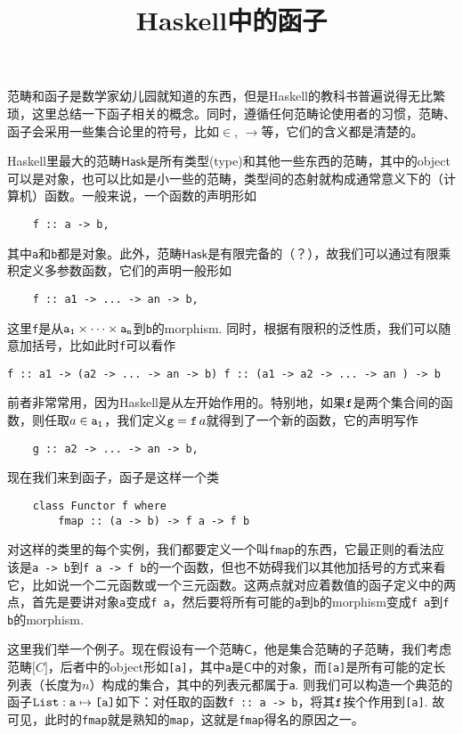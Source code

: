 \documentclass[10pt]{article}
\title{Haskell中的函子}
\author{}
\begin{document}
范畴和函子是数学家幼儿园就知道的东西，但是Haskell的教科书普遍说得无比繁琐，这里总结一下函子相关的概念。同时，遵循任何范畴论使用者的习惯，范畴、函子会采用一些集合论里的符号，比如$\in$, $\to$等，它们的含义都是清楚的。

Haskell里最大的范畴$\mathsf{Hask}$是所有类型(type)和其他一些东西的范畴，其中的object可以是对象，也可以比如是小一些的范畴，类型间的态射就构成通常意义下的（计算机）函数。一般来说，一个函数的声明形如
\begin{lstlisting}
    f :: a -> b,
\end{lstlisting}
其中{\tt a}和{\tt b}都是对象。此外，范畴$\mathsf{Hask}$是有限完备的（？），故我们可以通过有限乘积定义多参数函数，它们的声明一般形如
\begin{lstlisting}
    f :: a1 -> ... -> an -> b,
\end{lstlisting}
这里{\tt f}是从$\tt a_1\times \cdots \times a_n$到{\tt b}的morphism. 同时，根据有限积的泛性质，我们可以随意加括号，比如此时{\tt f}可以看作
\begin{center}
    \tt f :: a1 -> (a2 -> ...~-> an -> b) \quad  f :: (a1 -> a2 -> ...~-> an ) -> b
\end{center}
前者非常常用，因为Haskell是从左开始作用的。特别地，如果$\tt f$是两个集合间的函数，则任取$a\in {\tt a_1}$，我们定义${\tt g}= {\tt f}\, a$就得到了一个新的函数，它的声明写作
\begin{lstlisting}
    g :: a2 -> ... -> an -> b,
\end{lstlisting}

现在我们来到函子，函子是这样一个类
\begin{lstlisting}
    class Functor f where
        fmap :: (a -> b) -> f a -> f b
\end{lstlisting}
对这样的类里的每个实例，我们都要定义一个叫{\tt fmap}的东西，它最正则的看法应该是{\tt a -> b}到{\tt f a -> f b}的一个函数，但也不妨碍我们以其他加括号的方式来看它，比如说一个二元函数或一个三元函数。这两点就对应着数值的函子定义中的两点，首先是要讲对象{\tt a}变成{\tt f a}，然后要将所有可能的{\tt a}到{\tt b}的morphism变成{\tt f a}到{\tt f b}的morphism. 

这里我们举一个例子。现在假设有一个范畴$\mathsf C$，他是集合范畴的子范畴，我们考虑范畴$\mathsf [C]$，后者中的object形如{\tt [a]}，其中{\tt a}是$\mathsf C$中的对象，而{\tt [a]}是所有可能的定长列表（长度为$n$）构成的集合，其中的列表元都属于{\tt a}. 则我们可以构造一个典范的函子{$\tt List : a \mapsto \text{\tt [a]}$}如下：对任取的函数{\tt f~::~a -> b}，将其$\tt f$挨个作用到{\tt [a]}. 故可见，此时的{\tt fmap}就是熟知的{\tt map}，这就是{\tt fmap}得名的原因之一。
\end{document}

